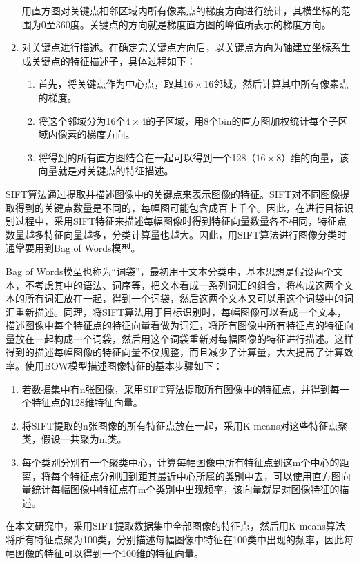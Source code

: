 \begin{enumerate}
  用直方图对关键点相邻区域内所有像素点的梯度方向进行统计，其横坐标的范围为0至360度。关键点的方向就是梯度直方图的峰值所表示的梯度方向。
\item 对关键点进行描述。在确定完关键点方向后，以关键点方向为轴建立坐标系生成关键点的特征描述子，具体过程如下：
  \begin{enumerate}
  \item 首先，将关键点作为中心点，取其$16\times16$邻域，然后计算其中所有像素点的梯度。
  \item 将这个邻域分为16个$4\times4$的子区域，用8个bin的直方图加权统计每个子区域内像素的梯度方向。
  \item 将得到的所有直方图结合在一起可以得到一个128（$16 \times 8$）维的向量，该向量就是对关键点的特征描述。
  \end{enumerate}
\end{enumerate}

SIFT算法通过提取并描述图像中的关键点来表示图像的特征。SIFT对不同图像提取得到的关键点数量是不同的，每幅图可能包含成百上千个。因此，在进行目标识别过程中，采用SIFT特征来描述每幅图像时得到特征向量数量各不相同，特征点数量越多特征向量越多，分类计算量也越大。因此，用SIFT算法进行图像分类时通常要用到Bag of Words模型。

Bag of Words模型也称为“词袋”，最初用于文本分类中，基本思想是假设两个文本，不考虑其中的语法、词序等，把文本看成一系列词汇的组合，将构成这两个文本的所有词汇放在一起，得到一个词袋，然后这两个文本又可以用这个词袋中的词汇重新描述。同理，将SIFT算法用于目标识别时，每幅图像可以看成一个文本，描述图像中每个特征点的特征向量看做为词汇，将所有图像中所有特征点的特征向量放在一起构成一个词袋，然后用这个词袋重新对每幅图像的特征进行描述。这样得到的描述每幅图像的特征向量不仅规整，而且减少了计算量，大大提高了计算效率。使用BOW模型描述图像特征的基本步骤如下：
\begin{enumerate}
\item 若数据集中有n张图像，采用SIFT算法提取所有图像中的特征点，并得到每一个特征点的128维特征向量。
\item 将SIFT提取的n张图像的所有特征点放在一起，采用K-means对这些特征点聚类，假设一共聚为m类。
\item 每个类别分别有一个聚类中心，计算每幅图像中所有特征点到这m个中心的距离，将每个特征点分别归到距其最近中心所属的类别中去，可以使用直方图向量统计每幅图像中特征点在m个类别中出现频率，该向量就是对图像特征的描述。
\end{enumerate}

在本文研究中，采用SIFT提取数据集中全部图像的特征点，然后用K-means算法将所有特征点聚为100类，分别描述每幅图像中特征在100类中出现的频率，因此每幅图像的特征可以得到一个100维的特征向量。

